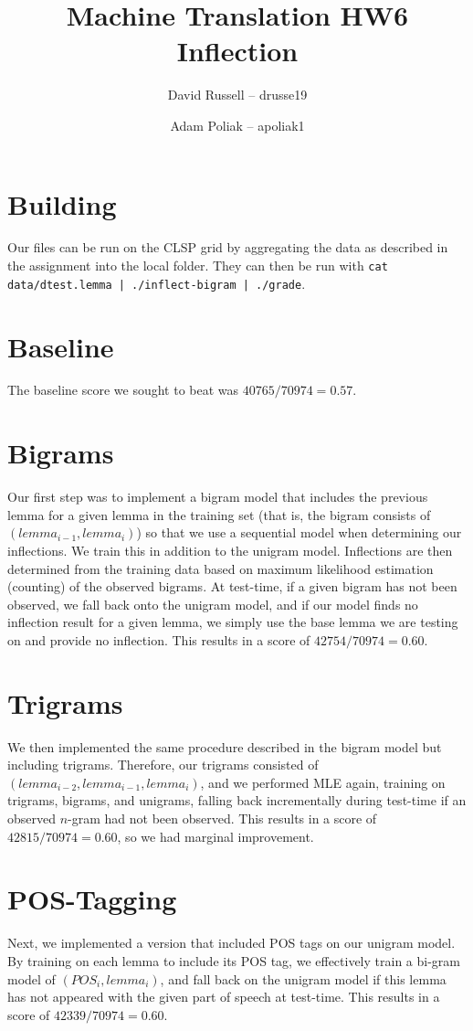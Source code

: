 \documentclass{article}
\title{Machine Translation HW6\\Inflection}
\author{David Russell -- drusse19 \and Adam Poliak -- apoliak1}
\begin{document}
    \maketitle
    \section{Building}
    Our files can be run on the CLSP grid by aggregating the data as described in the assignment into the local folder. They
    can then be run with \texttt{cat data/dtest.lemma | ./inflect-bigram | ./grade}. 

    \section{Baseline}
    The baseline score we sought to beat was $\boxed{40765 / 70974 = 0.57}$.
    
    \section{Bigrams}
        Our first step was to implement a bigram model that includes the previous lemma for a given lemma in the training set (that is, the bigram consists of $(lemma_{i-1}, lemma_i)$) so that
        we use a sequential model when determining our inflections. We train this in addition to the unigram model. Inflections are then determined from the training data based on maximum likelihood estimation (counting) of the observed bigrams. 
        At test-time, if a given bigram has not been observed, we fall back onto the unigram model, and if our model finds no inflection result for a given lemma, we simply use the base lemma we are testing
        on and provide no inflection. This results in a score of $\boxed{42754 / 70974 = 0.60}$. 

    \section{Trigrams}
        We then implemented the same procedure described in the bigram model but including trigrams. Therefore, our trigrams consisted of $(lemma_{i-2}, lemma_{i-1}, lemma_i)$, and we performed MLE again,
        training on trigrams, bigrams, and unigrams, falling back incrementally during test-time if an observed $n$-gram had not been observed. This results in a score of $\boxed{42815 / 70974 = 0.60}$, so 
        we had marginal improvement.

    \section{POS-Tagging}
        Next, we implemented a version that included POS tags on our unigram model. By training on each lemma to include its POS tag, we effectively train a bi-gram model of $(POS_i, lemma_i)$, and fall back on the
        unigram model if this lemma has not appeared with the given part of speech at test-time. This results in a score of $\boxed{42339 / 70974 = 0.60}$.
\end{document}
